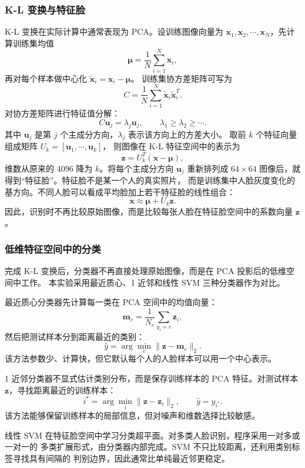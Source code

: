 \documentclass[UTF8,a4paper,12pt]{ctexart}
\begin{document}
\subsubsection{K-L 变换与特征脸}

K-L 变换在实际计算中通常表现为 PCA。设训练图像向量为
$\mathbf{x}_1,\mathbf{x}_2,\cdots,\mathbf{x}_N$，先计算训练集均值
\[
  \boldsymbol{\mu}=\frac{1}{N}\sum_{i=1}^{N}\mathbf{x}_i,
\]
再对每个样本做中心化 $\tilde{\mathbf{x}}_i=\mathbf{x}_i-\boldsymbol{\mu}$。
训练集协方差矩阵可写为
\[
  C=\frac{1}{N}\sum_{i=1}^{N}\tilde{\mathbf{x}}_i\tilde{\mathbf{x}}_i^T.
\]
对协方差矩阵进行特征值分解：
\[
  C\mathbf{u}_j=\lambda_j\mathbf{u}_j,\qquad
  \lambda_1\geq \lambda_2\geq \cdots .
\]
其中 $\mathbf{u}_j$ 是第 $j$ 个主成分方向，$\lambda_j$ 表示该方向上的方差大小。
取前 $k$ 个特征向量组成矩阵 $U_k=[\mathbf{u}_1,\cdots,\mathbf{u}_k]$，
则图像在 K-L 特征空间中的表示为
\[
  \mathbf{z}=U_k^T(\mathbf{x}-\boldsymbol{\mu}),
\]
维数从原来的 4096 降为 $k$。将每个主成分方向 $\mathbf{u}_j$ 重新排列成
$64\times64$ 图像后，就得到“特征脸”。特征脸不是某一个人的真实照片，
而是训练集中人脸灰度变化的基方向。不同人脸可以看成平均脸加上若干特征脸的线性组合：
\[
  \mathbf{x}\approx \boldsymbol{\mu}+U_k\mathbf{z}.
\]
因此，识别时不再比较原始图像，而是比较每张人脸在特征脸空间中的系数向量
$\mathbf{z}$。

\subsubsection{低维特征空间中的分类}

完成 K-L 变换后，分类器不再直接处理原始图像，而是在 PCA 投影后的低维空间中工作。
本实验采用最近质心、1 近邻和线性 SVM 三种分类器作为对比。

最近质心分类器先计算每一类在 PCA 空间中的均值向量：
\[
  \mathbf{m}_c=\frac{1}{N_c}\sum_{y_i=c}\mathbf{z}_i ,
\]
然后把测试样本分到距离最近的类别：
\[
  \hat{y}=\arg\min_c \|\mathbf{z}-\mathbf{m}_c\|_2 .
\]
该方法参数少、计算快，但它默认每个人的人脸样本可以用一个中心表示。

1 近邻分类器不显式估计类别分布，而是保存训练样本的 PCA 特征。对测试样本
$\mathbf{z}$，寻找距离最近的训练样本：
\[
  i^\ast=\arg\min_i \|\mathbf{z}-\mathbf{z}_i\|_2,\qquad
  \hat{y}=y_{i^\ast}.
\]
该方法能够保留训练样本的局部信息，但对噪声和维数选择比较敏感。

线性 SVM 在特征脸空间中学习分类超平面。对多类人脸识别，程序采用一对多或一对一的
多类扩展形式，由分类器内部完成。SVM 不只比较距离，还利用类别标签寻找具有间隔的
判别边界，因此通常比单纯最近邻更稳定。
\end{document}

